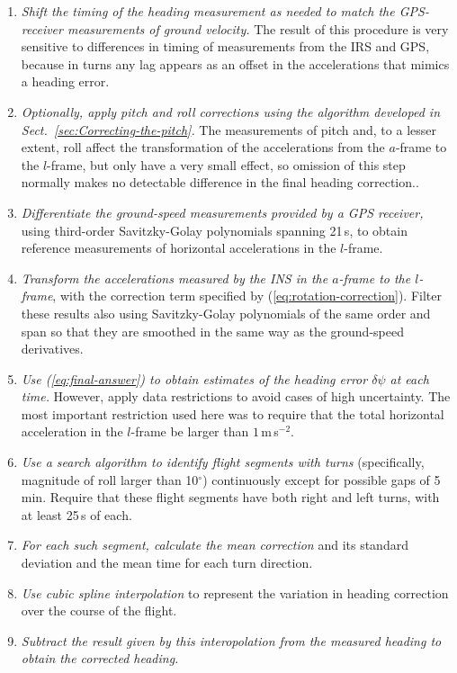 \documentclass[english,british,amtd,bookmarks=false,unicode=true]{copernicus}\usepackage[]{graphicx}\usepackage[]{color}
\begin{document}
\begin{enumerate}
\item \emph{Shift the timing of the heading measurement as needed to match
the GPS-receiver measurements of ground velocity. }The result of this
procedure is very sensitive to differences in timing of measurements
from the IRS and GPS, because in turns any lag appears as an offset
in the accelerations that mimics a heading error.
\item \emph{Optionally, apply pitch and roll corrections using the algorithm
developed in Sect.~\ref{sec:Correcting-the-pitch}. }The measurements
of pitch and, to a lesser extent, roll affect the transformation of
the accelerations from the $a$-frame to the $l$-frame, but only
have a very small effect, so omission of this step normally makes
no detectable difference in the final heading correction.. 
\item \emph{Differentiate the ground-speed measurements provided by a GPS
receiver,} using third-order Savitzky-Golay polynomials spanning 21\,s,
to obtain reference measurements of horizontal accelerations in the
$l$-frame. 
\item \emph{Transform the accelerations measured by the INS in the $a$-frame
to the $l$-frame}, with the correction term specified by (\ref{eq:rotation-correction}).
Filter these results also using Savitzky-Golay polynomials of the
same order and span so that they are smoothed in the same way as the
ground-speed derivatives.
\item \emph{Use (\ref{eq:final-answer}) to obtain estimates of the heading
error $\delta\psi$ at each time.} However, apply data restrictions
to avoid cases of high uncertainty. The most important restriction
used here was to require that the total horizontal acceleration in
the $l$-frame be larger than $1$\,m\,s$^{-2}$. 
\item \emph{Use a search algorithm to identify flight segments with turns}
(specifically, magnitude of roll larger than 10$^{\circ}$) continuously
except for possible gaps of 5\,min. Require that these flight segments
have both right and left turns, with at least 25\,s of each.
\item \emph{For each such segment, calculate the mean correction} and its
standard deviation and the mean time for each turn direction.
\item \emph{Use cubic spline interpolation} to represent the variation in
heading correction over the course of the flight. 
\item \emph{Subtract the result given by this interopolation from the measured
heading to obtain the corrected heading.}
\end{enumerate}
\end{document}
